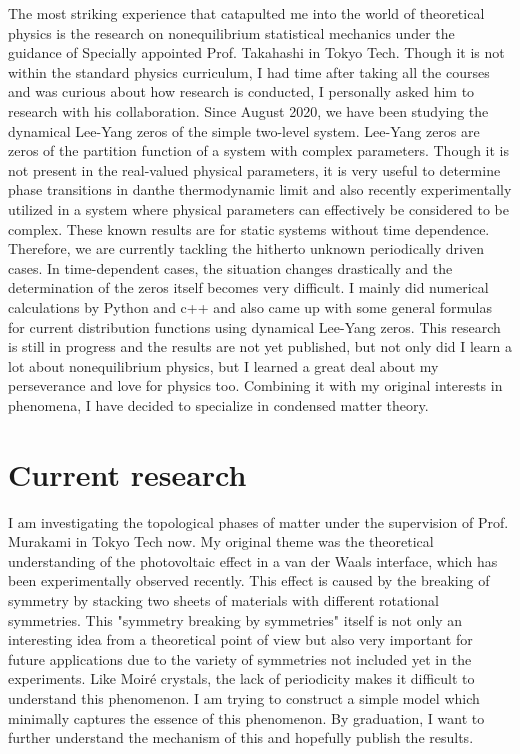 \documentclass[a4]{article}
\begin{document}
The most striking experience that catapulted me into the world of theoretical physics is the research on nonequilibrium statistical mechanics under the guidance of Specially appointed Prof. Takahashi in Tokyo Tech. Though it is not within the standard physics curriculum, I had time after taking all the courses and was curious about how research is conducted, I personally asked him to research with his collaboration. Since August 2020, we have been studying the dynamical Lee-Yang zeros of the simple two-level system. Lee-Yang zeros are zeros of the partition function of a system with complex parameters. Though it is not present in the real-valued physical parameters, it is very useful to determine phase transitions in danthe thermodynamic limit and also recently experimentally utilized in a system where physical parameters can effectively be considered to be complex. These known results are for static systems without time dependence. Therefore, we are currently tackling the hitherto unknown periodically driven cases. In time-dependent cases, the situation changes drastically and the determination of the zeros itself becomes very difficult. I mainly did numerical calculations by Python and c++ and also came up with some general formulas for current distribution functions using dynamical Lee-Yang zeros. This research is still in progress and the results are not yet published, but not only did I learn a lot about nonequilibrium physics, but I learned a great deal about my perseverance and love for physics too. Combining it with my original interests in phenomena, I have decided to specialize in condensed matter theory.\par

\section{Current research}
I am investigating the topological phases of matter under the supervision of Prof. Murakami in Tokyo Tech now. My original theme was the theoretical understanding of the photovoltaic effect in a van der Waals interface, which has been experimentally observed recently. This effect is caused by the breaking of symmetry by stacking two sheets of materials with different rotational symmetries. This "symmetry breaking by symmetries" itself is not only an interesting idea from a theoretical point of view but also very important for future applications due to the variety of symmetries not included yet in the experiments. Like Moir\'{e} crystals, the lack of periodicity makes it difficult to understand this phenomenon. I am trying to construct a simple model which minimally captures the essence of this phenomenon. By graduation, I want to further understand the mechanism of this and hopefully publish the results.
\end{document}
